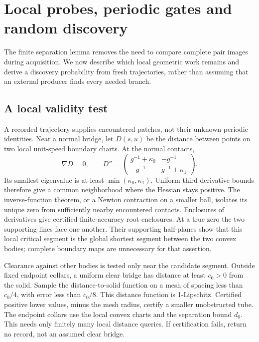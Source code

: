 \section{Local probes, periodic gates and random discovery}
\label{sec:acquisition}
The finite separation lemma removes the need to compare complete pair
images during acquisition. We now describe which local geometric work
remains and derive a discovery probability from fresh trajectories, rather
than assuming that an external producer finds every needed branch.

\subsection{A local validity test}
A recorded trajectory supplies encountered patches, not their unknown
periodic identities. Near a normal bridge, let $D(s,u)$ be the distance
between points on two local unit-speed boundary charts. At the normal
contacts,
\begin{equation}\label{eq:normal-hessian}
 \nabla D=0,\qquad D''=
 \begin{pmatrix}g^{-1}+\kappa_0&-g^{-1}\\
                -g^{-1}&g^{-1}+\kappa_1\end{pmatrix}.
\end{equation}
Its smallest eigenvalue is at least $\min(\kappa_0,\kappa_1)$.
Uniform third-derivative bounds therefore give a common neighborhood
where the Hessian stays positive. The inverse-function theorem, or a
Newton contraction on a smaller ball, isolates its unique zero from
sufficiently nearby encountered contacts. Enclosures of derivatives give
certified finite-accuracy root enclosures. At a true zero the two supporting
lines face one another. Their supporting half-planes show that this local
critical segment is the global shortest segment between the two convex
bodies; complete boundary maps are unnecessary for that assertion.

Clearance against other bodies is tested only near the candidate segment.
Outside fixed endpoint collars, a uniform clear bridge has distance at
least $c_0>0$ from the solid. Sample the distance-to-solid function on a
mesh of spacing less than $c_0/4$, with error less than $c_0/8$.
This distance function is 1-Lipschitz. Certified positive lower values,
minus the mesh radius, certify a smaller unobstructed tube. The endpoint
collars use the local convex charts and the separation bound $d_0$.
This needs only finitely many local distance queries. If certification
fails, return no record, not an assumed clear bridge.

